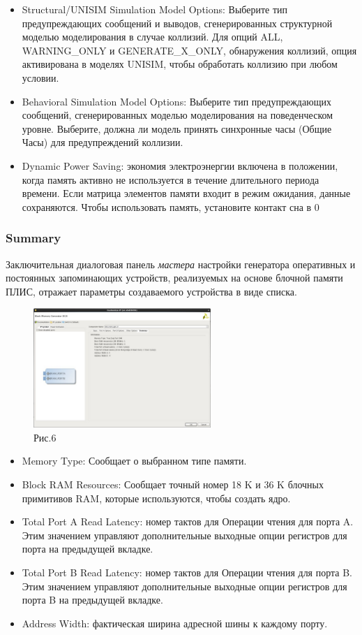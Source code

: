 \begin{itemize}
\item Structural/UNISIM Simulation Model Options: Выберите тип предупреждающих сообщений и выводов, сгенерированных структурной моделью моделирования в случае коллизий. Для опций ALL, WARNING_ONLY и GENERATE_X_ONLY, обнаружения коллизий, опция активирована в моделях UNISIM, чтобы обработать коллизию при любом условии.
\item Behavioral Simulation Model Options: Выберите тип предупреждающих сообщений, сгенерированных моделью моделирования на поведенческом уровне. Выберите, должна ли модель принять синхронные часы (Общие Часы) для предупреждений коллизии.
\item Dynamic Power Saving: экономия электроэнергии включена в положении, когда память активно не используется в течение длительного периода времени. Если матрица элементов памяти входит в режим ожидания, данные сохраняются. Чтобы использовать память, установите контакт сна в 0
\end{itemize}

\subsubsection{Summary}

Заключительная диалоговая панель \emph {мастера} настройки генератора оперативных и постоянных запоминающих устройств, реализуемых на основе блочной памяти ПЛИС, отражает параметры создаваемого устройства в виде списка.

\begin{figure}[h]
\centering
\includegraphics[width=0.6\textwidth]{6}
\caption{Рис.6}
\label{6_label}
\end{figure}

\begin{itemize}
\item Memory Type: Сообщает о выбранном типе памяти.
\item Block RAM Resources: Сообщает точный номер 18 K и 36 K блочных примитивов RAM, которые используются, чтобы создать ядро.
\item Total Port A Read Latency: номер тактов для Операции чтения для порта A. Этим значением управляют дополнительные выходные опции регистров для порта на предыдущей вкладке.
\item Total Port B Read Latency: номер тактов для Операции чтения для порта B. Этим значением управляют дополнительные выходные опции регистров для порта B на предыдущей вкладке.
\item Address Width: фактическая ширина адресной шины к каждому порту.
\end{itemize}

